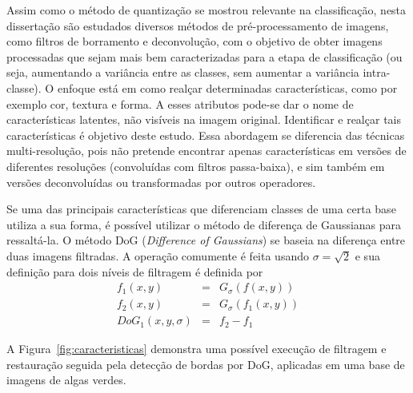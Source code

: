 Assim como o método de quantização se mostrou relevante na classificação, nesta dissertação são estudados diversos métodos de pré-processamento de imagens, como filtros de borramento e deconvolução, com o objetivo de obter imagens processadas que sejam mais bem caracterizadas para a etapa de classificação (ou seja, aumentando a variância entre as classes, sem aumentar a variância intra-classe). O enfoque está em como realçar determinadas características, como por exemplo cor, textura e forma. A esses atributos pode-se dar o nome de características latentes, não visíveis na imagem original. Identificar e realçar tais características é objetivo deste estudo. Essa abordagem se diferencia das técnicas multi-resolução, pois não pretende encontrar apenas características em versões de diferentes resoluções (convoluídas com filtros passa-baixa), e sim também em versões deconvoluídas ou transformadas por outros operadores.

Se uma das principais características que diferenciam classes de uma certa base utiliza a sua forma, é possível utilizar o método de diferença de Gaussianas para ressaltá-la.
O método DoG (\textit{Difference of Gaussians}) se baseia na diferença entre duas imagens filtradas. A operação comumente é feita usando $\sigma = \sqrt{2}$ e sua definição para dois níveis de filtragem é definida por
\begin{eqnarray*}
         f_1(x,y) &=& G_{\sigma}(f(x,y)) \\
         f_2(x,y) &=& G_{\sigma}(f_1(x,y)) \\
         DoG_1(x,y,\sigma) &=& f_2 - f_1
\end{eqnarray*}

A Figura~\ref{fig:caracteristicas} demonstra uma possível execução de filtragem e restauração seguida pela detecção de bordas por DoG, aplicadas em uma base de imagens de algas verdes.


